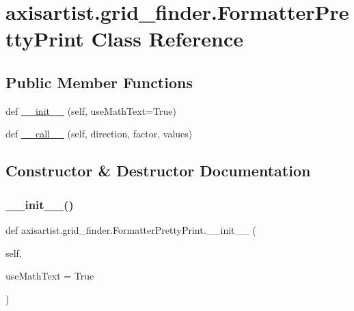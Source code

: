 \hypertarget{classaxisartist_1_1grid__finder_1_1FormatterPrettyPrint}{}\section{axisartist.\+grid\+\_\+finder.\+Formatter\+Pretty\+Print Class Reference}
\label{classaxisartist_1_1grid__finder_1_1FormatterPrettyPrint}
\subsection*{Public Member Functions}
\begin{DoxyCompactItemize}
\item 
def \hyperlink{classaxisartist_1_1grid__finder_1_1FormatterPrettyPrint_a6ce0b033674f37656fb484a9b4f43670}{\+\_\+\+\_\+init\+\_\+\+\_\+} (self, use\+Math\+Text=True)
\item 
def \hyperlink{classaxisartist_1_1grid__finder_1_1FormatterPrettyPrint_abeb02f8e0c919122d170a76e0a1424b2}{\+\_\+\+\_\+call\+\_\+\+\_\+} (self, direction, factor, values)
\end{DoxyCompactItemize}


\subsection{Constructor \& Destructor Documentation}
\mbox{\label{classaxisartist_1_1grid__finder_1_1FormatterPrettyPrint_a6ce0b033674f37656fb484a9b4f43670}} 
\subsubsection{\texorpdfstring{\+\_\+\+\_\+init\+\_\+\+\_\+()}{\_\_init\_\_()}}
{\footnotesize\ttfamily def axisartist.\+grid\+\_\+finder.\+Formatter\+Pretty\+Print.\+\_\+\+\_\+init\+\_\+\+\_\+ (\begin{DoxyParamCaption}\item[{}]{self,  }\item[{}]{use\+Math\+Text = {\ttfamily True} }\end{DoxyParamCaption})}



